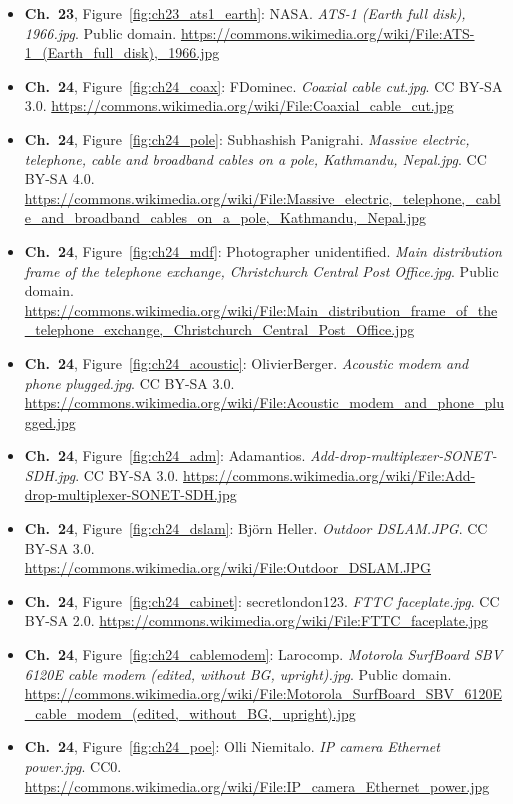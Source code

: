 \begin{small}
\begin{itemize}[leftmargin=0pt,itemsep=2pt,label={}]
\item \textbf{Ch.~23}, Figure~\ref{fig:ch23_ats1_earth}: NASA. \emph{ATS-\allowbreak{}1 (Earth full disk), 1966.\allowbreak{}jpg}. Public domain. \url{https://commons.wikimedia.org/wiki/File:ATS-1_(Earth_full_disk),_1966.jpg}
\item \textbf{Ch.~24}, Figure~\ref{fig:ch24_coax}: FDominec. \emph{Coaxial cable cut.\allowbreak{}jpg}. CC BY-SA 3.0. \url{https://commons.wikimedia.org/wiki/File:Coaxial_cable_cut.jpg}
\item \textbf{Ch.~24}, Figure~\ref{fig:ch24_pole}: Subhashish Panigrahi. \emph{Massive electric, telephone, cable and broadband cables on a pole, Kathmandu, Nepal.\allowbreak{}jpg}. CC BY-SA 4.0. \url{https://commons.wikimedia.org/wiki/File:Massive_electric,_telephone,_cable_and_broadband_cables_on_a_pole,_Kathmandu,_Nepal.jpg}
\item \textbf{Ch.~24}, Figure~\ref{fig:ch24_mdf}: Photographer unidentified. \emph{Main distribution frame of the telephone exchange, Christchurch Central Post Office.\allowbreak{}jpg}. Public domain. \url{https://commons.wikimedia.org/wiki/File:Main_distribution_frame_of_the_telephone_exchange,_Christchurch_Central_Post_Office.jpg}
\item \textbf{Ch.~24}, Figure~\ref{fig:ch24_acoustic}: OlivierBerger. \emph{Acoustic modem and phone plugged.\allowbreak{}jpg}. CC BY-SA 3.0. \url{https://commons.wikimedia.org/wiki/File:Acoustic_modem_and_phone_plugged.jpg}
\item \textbf{Ch.~24}, Figure~\ref{fig:ch24_adm}: Adamantios. \emph{Add-\allowbreak{}drop-\allowbreak{}multiplexer-\allowbreak{}SONET-\allowbreak{}SDH.\allowbreak{}jpg}. CC BY-SA 3.0. \url{https://commons.wikimedia.org/wiki/File:Add-drop-multiplexer-SONET-SDH.jpg}
\item \textbf{Ch.~24}, Figure~\ref{fig:ch24_dslam}: Björn Heller. \emph{Outdoor DSLAM.\allowbreak{}JPG}. CC BY-SA 3.0. \url{https://commons.wikimedia.org/wiki/File:Outdoor_DSLAM.JPG}
\item \textbf{Ch.~24}, Figure~\ref{fig:ch24_cabinet}: secretlondon123. \emph{FTTC faceplate.\allowbreak{}jpg}. CC BY-SA 2.0. \url{https://commons.wikimedia.org/wiki/File:FTTC_faceplate.jpg}
\item \textbf{Ch.~24}, Figure~\ref{fig:ch24_cablemodem}: Larocomp. \emph{Motorola SurfBoard SBV 6120E cable modem (edited, without BG, upright).\allowbreak{}jpg}. Public domain. \url{https://commons.wikimedia.org/wiki/File:Motorola_SurfBoard_SBV_6120E_cable_modem_(edited,_without_BG,_upright).jpg}
\item \textbf{Ch.~24}, Figure~\ref{fig:ch24_poe}: Olli Niemitalo. \emph{IP camera Ethernet power.\allowbreak{}jpg}. CC0. \url{https://commons.wikimedia.org/wiki/File:IP_camera_Ethernet_power.jpg}

\end{itemize}
\end{small}
